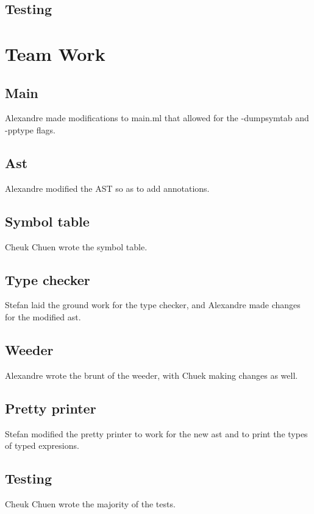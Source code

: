 \documentclass{article}
\begin{document}
\subsection*{Testing}

\section*{Team Work}
\subsection*{Main}
Alexandre made modifications to main.ml that allowed for the -dumpsymtab and -pptype flags.

\subsection*{Ast}
Alexandre modified the AST so as to add annotations.

\subsection*{Symbol table}
Cheuk Chuen wrote the symbol table.

\subsection*{Type checker}
Stefan laid the ground work for the type checker, and Alexandre made changes for the modified ast.

\subsection*{Weeder}
Alexandre wrote the brunt of the weeder, with Chuek making changes as well.

\subsection*{Pretty printer}
Stefan modified the pretty printer to work for the new ast and to print the types of typed expresions.

\subsection*{Testing}
Cheuk Chuen wrote the majority of the tests.


\end{document}
